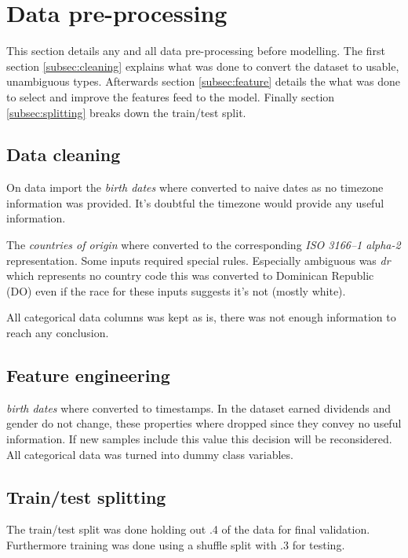 \section{Data pre-processing}
\label{sec:data}

This section details any and all data pre-processing before modelling.
The first section \vref{subsec:cleaning} explains what was done to
convert the dataset to usable, unambiguous types.
Afterwards section \vref{subsec:feature} details the what was
done to select and improve the features feed to the model.
Finally section \vref{subsec:splitting} breaks down the train/test split.


\subsection{Data cleaning}
\label{subsec:cleaning}

On data import the \emph{birth dates} where converted to naive dates as no
timezone information was provided.
It's doubtful the timezone would provide any useful information.

The \emph{countries of origin} where converted
to the corresponding \emph{ISO 3166--1 alpha-2} representation.
Some inputs required special rules.
Especially ambiguous was \emph{dr} which
represents no country code this was converted to Dominican Republic (DO)
even if the race for these inputs suggests it's not (mostly white).

All categorical data columns was kept as is, there was not enough information
to reach any conclusion.


\subsection{Feature engineering}
\label{subsec:feature}

\emph{birth dates} where converted to timestamps.
In the dataset earned dividends and gender do not change,
these properties where dropped since they convey no useful information.
If new samples include this value this decision will be reconsidered.
All categorical data was turned into dummy class variables.

\subsection{Train/test splitting}
\label{subsec:splitting}

The train/test split was done holding out .4 of the data for final
validation.
Furthermore training was done using a shuffle split with .3 for testing.

